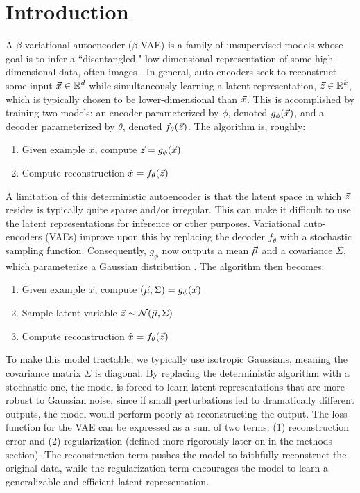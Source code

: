 \section{Introduction}

A $\beta$-variational autoencoder ($\beta$-VAE) is a family of unsupervised models whose goal is to infer a ``disentangled," low-dimensional representation of some high-dimensional data, often images \cite{weng2018VAE}. In general, auto-encoders seek to reconstruct some input $\vec{x}\in\mathbb{R}^d$ while simultaneously learning a latent representation, $\vec{z}\in\mathbb{R}^k$, which is typically chosen to be lower-dimensional than $\vec{x}$. This is accomplished by training two models: an encoder parameterized by $\phi$, denoted $g_\phi(\vec{x})$, and a decoder parameterized by $\theta$, denoted $f_\theta(\vec{z})$. The algorithm is, roughly:
\begin{enumerate}
    \item Given example $\vec{x}$, compute $\vec{z} = g_\phi(\vec{x})$
    \item Compute reconstruction $\hat{x} = f_\theta(\vec{z})$
\end{enumerate}
A limitation of this deterministic autoencoder is that the latent space in which $\vec{z}$ resides is typically quite sparse and/or irregular. This can make it difficult to use the latent representations for inference or other purposes. Variational auto-encoders (VAEs) improve upon this by replacing the decoder $f_\theta$ with a stochastic sampling function. Consequently, $g_\phi$ now outputs a mean $\vec{\mu}$ and a covariance $\Sigma$, which parameterize a Gaussian distribution \cite{kingma2013auto}. The algorithm then becomes:
\begin{enumerate}
    \item Given example $\vec{x}$, compute ($\vec{\mu}, \Sigma) = g_\phi(\vec{x})$
    \item Sample latent variable $\vec{z} \sim \mathcal{N}(\vec{\mu}, \Sigma)$
    \item Compute reconstruction $\hat{x} = f_\theta(\vec{z})$
\end{enumerate}

To make this model tractable, we typically use isotropic Gaussians, meaning the covariance matrix $\Sigma$ is diagonal. By replacing the deterministic algorithm with a stochastic one, the model is forced to learn latent representations that are more robust to Gaussian noise, since if small perturbations led to dramatically different outputs, the model would perform poorly at reconstructing the output. The loss function for the VAE can be expressed as a sum of two terms: (1) reconstruction error and (2) regularization (defined more rigorously later on in the methods section). The reconstruction term pushes the model to faithfully reconstruct the original data, while the regularization term encourages the model to learn a generalizable and efficient latent representation.

